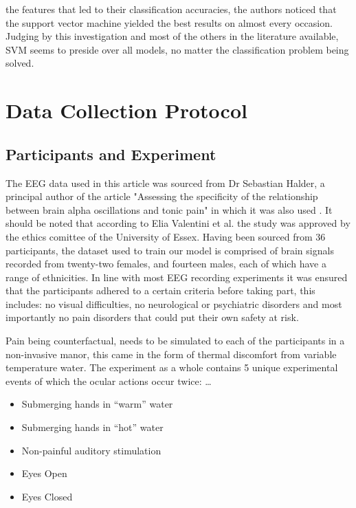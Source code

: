 \documentclass[11pt]{article}
\begin{document}
the features that led to their classification accuracies, the authors noticed that the support vector machine yielded the best results on almost every occasion. Judging by this investigation and most of the others in the literature available, SVM seems to preside over all models, no matter the classification problem being solved.

\section{Data Collection Protocol}

\subsection {Participants and Experiment}

The EEG data used in this article was sourced from Dr Sebastian Halder, a principal author of the article "Assessing the specificity of the relationship between brain alpha oscillations and tonic pain" in which it was also used \cite{VALENTINI2022119143}. It should be noted that according to Elia Valentini et al. the study was approved by the ethics comittee of the University of Essex. Having been sourced from 36 participants, the dataset used to train our model is comprised of brain signals recorded from twenty-two females, and fourteen males, each of which have a range of ethnicities. In line with most EEG recording experiments it was ensured that the participants adhered to a certain criteria before taking part, this includes: no visual difficulties, no neurological or psychiatric disorders and most importantly no pain disorders that could put their own safety at risk.

Pain being counterfactual, needs to be simulated to each of the participants in a non-invasive manor, this came in the form of thermal discomfort from variable temperature water. The experiment as a whole contains 5 unique experimental events of which the ocular actions occur twice:
\dots
\begin{itemize}
\item Submerging hands in “warm” water
\item Submerging hands in “hot” water
\item Non-painful auditory stimulation
\item Eyes Open
\item Eyes Closed
\end{itemize}
\end{document}
